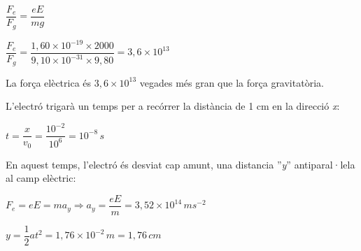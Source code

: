 \begin{solapartat}

 $\dfrac{F_e}{F_g} = \dfrac{eE}{mg}$

\medskip
 $\dfrac{F_e}{F_g} = \dfrac{1,60\times 10^{-19}\times 2000}{9,10\times 10^{-31}\times 9,80} = 3,6\times 10^{13}$

\medskip
{} La força elèctrica és $3,6\times 10^{13}$ vegades més gran que la força gravitatòria.
\end{solapartat}

\begin{solapartat}
L'electró trigarà un temps per a recórrer la distància de 1 cm en la direcció \textit{x}:

\medskip
{} $t = \dfrac{x}{v_0} = \dfrac{10^{-2}}{10^{6}} = 10^{-8}\,s$

\smallskip
En aquest temps, l'electró és desviat cap amunt, una distancia ”\textit{y}” antiparal·lela al camp elèctric:

\medskip
{} $F_e = eE = ma_y \Rightarrow a_y = \dfrac{eE}{m} = 3,52\times 10^{14}\,ms^{-2}$

\smallskip
{} $y = \dfrac{1}{2}at^2 = 1,76\times 10^{-2}\,m = 1,76\,cm$
\end{solapartat}

